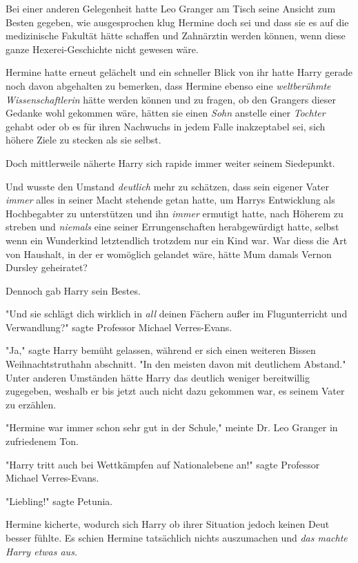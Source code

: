 {Bei einer anderen Gelegenheit hatte Leo Granger am Tisch seine Ansicht zum Besten gegeben, wie ausgesprochen klug Hermine doch sei und dass sie es auf die medizinische Fakultät hätte schaffen und Zahnärztin werden können, wenn diese ganze Hexerei-Geschichte nicht gewesen wäre.

Hermine hatte erneut gelächelt und ein schneller Blick von ihr hatte Harry gerade noch davon abgehalten zu bemerken, dass Hermine ebenso eine \emph{weltberühmte Wissenschaftlerin} hätte werden können und zu fragen, ob den Grangers dieser Gedanke wohl gekommen wäre, hätten sie einen \emph{Sohn} anstelle einer \emph{Tochter} gehabt oder ob es für ihren Nachwuchs in jedem Falle inakzeptabel sei, sich höhere Ziele zu stecken als sie selbst.

Doch mittlerweile näherte Harry sich rapide immer weiter seinem Siedepunkt.

Und wusste den Umstand \emph{deutlich} mehr zu schätzen, dass sein eigener Vater \emph{immer} alles in seiner Macht stehende getan hatte, um Harrys Entwicklung als Hochbegabter zu unterstützen und ihn \emph{immer} ermutigt hatte, nach Höherem zu streben und \emph{niemals} eine seiner Errungenschaften herabgewürdigt hatte, selbst wenn ein Wunderkind letztendlich trotzdem nur ein Kind war. War diess die Art von Haushalt, in der er womöglich gelandet wäre, hätte Mum damals Vernon Dursley geheiratet?

Dennoch gab Harry sein Bestes.

"Und sie schlägt dich wirklich in \emph{all} deinen Fächern außer im Flugunterricht und Verwandlung?" sagte Professor Michael Verres-Evans.

"Ja," sagte Harry bemüht gelassen, während er sich einen weiteren Bissen Weihnachtstruthahn abschnitt. "In den meisten davon mit deutlichem Abstand." Unter anderen Umständen hätte Harry das deutlich weniger bereitwillig zugegeben, weshalb er bis jetzt auch nicht dazu gekommen war, es seinem Vater zu erzählen.

"Hermine war immer schon sehr gut in der Schule," meinte Dr. Leo Granger in zufriedenem Ton.

"Harry tritt auch bei Wettkämpfen auf Nationalebene an!" sagte Professor Michael Verres-Evans.

"Liebling!" sagte Petunia.

Hermine kicherte, wodurch sich Harry ob ihrer Situation jedoch keinen Deut besser fühlte. Es schien Hermine tatsächlich nichts auszumachen und \emph{das machte Harry etwas aus.}

}
